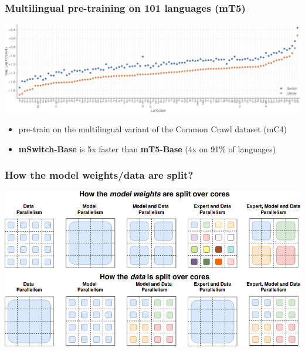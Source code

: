 \documentclass{beamer}
\begin{document}
\begin{frame}
    \frametitle{Multilingual pre-training on 101 languages (mT5)}
    \begin{center}
        \includegraphics[scale=0.25]{img/switch_transformers_multilingual_pretraining.png}
        \begin{itemize}
            \item pre-train on the multilingual variant of the Common Crawl dataset (mC4)
            \item \textbf{mSwitch-Base} is 5x faster than \textbf{mT5-Base} (4x on 91\% of languages)
        \end{itemize}
    \end{center}
\end{frame}

\begin{frame}
    \frametitle{How the model weights/data are split?}
    \begin{center}
        \includegraphics[scale=0.39]{img/switch_transformers_model_data_distribution.png}
    \end{center}
\end{frame}
\end{document}
